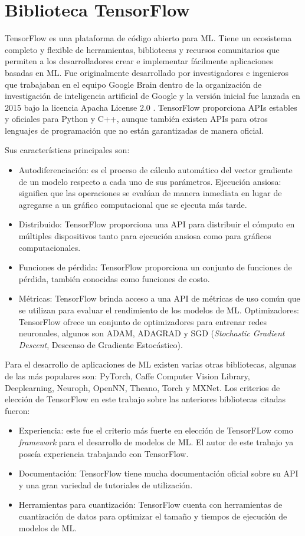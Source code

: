 \section{Biblioteca TensorFlow}
TensorFlow es una plataforma de código abierto para ML. Tiene un ecosistema completo y flexible de herramientas, bibliotecas y recursos comunitarios que permiten a los desarrolladores crear e implementar fácilmente aplicaciones basadas en ML. Fue originalmente desarrollado por investigadores e ingenieros que trabajaban en el equipo Google Brain dentro de la organización de investigación de inteligencia artificial de Google y la versión inicial fue lanzada en 2015 bajo la licencia Apacha License 2.0 \cite{tf_info}. TensorFlow proporciona APIs estables y oficiales para Python y C++, aunque también existen APIs para otros lenguajes de programación que no están garantizadas de manera oficial.

Sus características principales son:
\begin{itemize}
	\item Autodiferenciación: es el proceso de cálculo automático del vector gradiente de un modelo respecto a cada uno de sus parámetros.
	Ejecución ansiosa: significa que las operaciones se evalúan de manera inmediata en lugar de agregarse a un gráfico computacional que se ejecuta más tarde.
	\item Distribuido: TensorFlow proporciona una API para distribuir el cómputo en múltiples dispositivos tanto para ejecución ansiosa como para gráficos computacionales.
	\item Funciones de pérdida: TensorFlow proporciona un conjunto de funciones de pérdida, también conocidas como funciones de costo.
	\item Métricas: TensorFlow brinda acceso a una API de métricas de uso común que se utilizan para evaluar el rendimiento de los modelos de ML.
	Optimizadores: TensorFlow ofrece un conjunto de optimizadores para entrenar redes neuronales, algunos son ADAM, ADAGRAD y SGD (\textit{Stochastic Gradient Descent}, Descenso de Gradiente Estocástico).
\end{itemize}

Para el desarrollo de aplicaciones de ML existen varias otras bibliotecas, algunas de las más populares son: PyTorch, Caffe Computer Vision Library, Deeplearning, Neuroph, OpenNN, Theano, Torch y MXNet. Los criterios de elección de TensorFlow en este trabajo sobre las anteriores bibliotecas citadas fueron:
\begin{itemize}
	\item Experiencia: este fue el criterio más fuerte en elección de TensorFLow como \textit{framework} para el desarrollo de modelos de ML. El autor de este trabajo ya poseía experiencia trabajando con TensorFlow.
	\item Documentación: TensorFlow tiene mucha documentación oficial sobre su API y una gran variedad de tutoriales de utilización.
	\item Herramientas para cuantización: TensorFlow cuenta con herramientas de cuantización de datos para optimizar el tamaño y tiempos de ejecución de modelos de ML.
\end{itemize}

